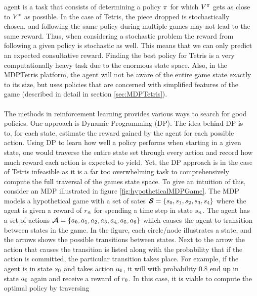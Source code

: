 agent is a task that consists of determining a policy $\pi$ for which
$V^{\pi}$ gets as close to $V^{*}$
as possible. In the case of Tetris, the piece dropped is stochastically 
chosen, and following the same policy during multiple games may not lead to the 
same reward. Thus, when considering a stochastic problem the reward 
from following a given policy is stochastic as well. This means that 
we can only predict an expected consultative reward.
Finding the best policy for Tetris is a very computationally heavy 
task due to the enormous state space. Also, in the MDPTetris platform,
the agent will not be aware of the entire game state exactly to its 
size, but uses policies that are concerned with simplified
features of the game (described in detail in section \ref{sec:MDPTetris}).\\
\\
The methods in reinforcement learning provides various ways to
search for good policies.
One approach is 
Dynamic Programming (DP). The idea behind DP is to, for each state,
estimate the reward gained by the agent for each possible action.
Using DP to learn how well a policy performs when starting in a 
given state, one would traverse the entire state set through every
action and record how much reward each action is expected to 
yield.
Yet, the DP approach is in the case of Tetris infeasible as it 
is a far too overwhelming task to comprehensively compute
the full traversal of the games state space. 
To give an intuition of this, consider
an MDP illustrated in figure \ref{fig:hypotheticalMDPGame}.
The MDP models a hypothetical game with a set of sates 
$\boldsymbol{\mathcal{S}} = \{s_0, s_1, s_2, s_3,
s_4\}$ where the agent is given a reward of $r_n$
for spending a time step in state $s_n$. The agent has a 
set of actions $\boldsymbol{\mathcal{A}} = \{a_0, a_1, 
a_2, a_3, a_4, 
a_5, a_6\}$ which causes the agent to transition 
between states in the game. In the figure, each circle/node illustrates a 
state, and the arrows shows the possible transitions between states.
Next to the arrow the action that causes the transition is listed 
along with the probability that if the action is committed, the particular 
transition takes place. For example, if the agent is in state $s_0$
and takes action $a_0$, it will with probability 0.8 end
up in state $a_0$ again and receive a reward of $r_0$.
In this case, it is viable to compute the optimal policy by traversing
